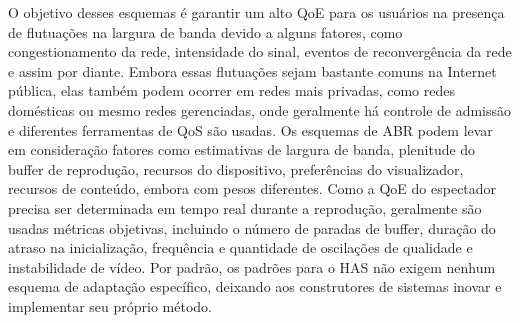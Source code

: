 O objetivo desses esquemas é garantir um alto QoE para os usuários na presença de flutuações na largura de banda devido a alguns fatores, como congestionamento da rede, intensidade do sinal, eventos de reconvergência da rede e assim por diante. Embora essas flutuações sejam bastante comuns na Internet pública, elas também podem ocorrer em redes mais privadas, como redes domésticas ou mesmo redes gerenciadas, onde geralmente há controle de admissão e diferentes ferramentas de QoS são usadas. Os esquemas de ABR podem levar em consideração fatores como estimativas de largura de banda, plenitude do buffer de reprodução, recursos do dispositivo, preferências do visualizador, recursos de conteúdo, embora com pesos diferentes. Como a QoE do espectador precisa ser determinada em tempo real durante a reprodução, geralmente são usadas métricas objetivas, incluindo o número de paradas de buffer, duração do atraso na inicialização, frequência e quantidade de oscilações de qualidade e instabilidade de vídeo. Por padrão, os padrões para o HAS não exigem nenhum esquema de adaptação específico, deixando aos construtores de sistemas inovar e implementar seu próprio método.


